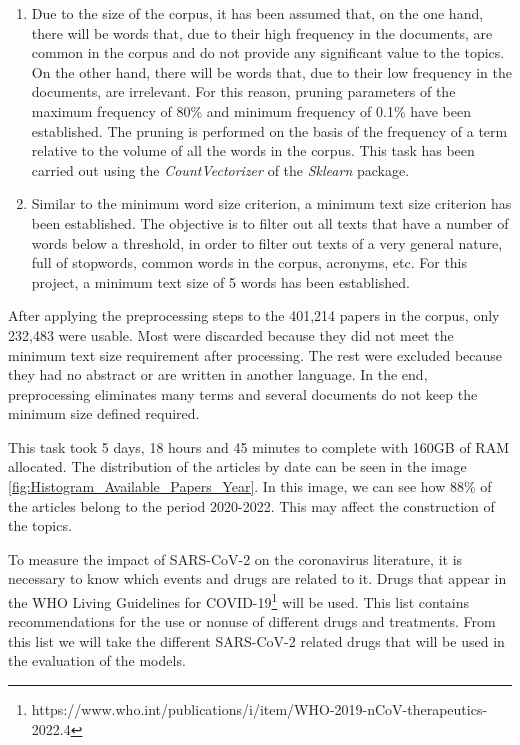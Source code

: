 \documentclass[a4paper,10pt]{article}
\begin{document}
\begin{enumerate}
    \item Due to the size of the corpus, it has been assumed that, on the one hand, there will be words that, due to their high frequency in the documents, are common in the corpus and do not provide any significant value to the topics. On the other hand, there will be words that, due to their low frequency in the documents, are irrelevant. For this reason, pruning parameters of the maximum frequency of 80\% and minimum frequency of 0.1\% have been established. The pruning is performed on the basis of the frequency of a term relative to the volume of all the words in the corpus. This task has been carried out using the \textit{CountVectorizer} of the \textit{Sklearn} package.

    \item Similar to the minimum word size criterion, a minimum text size criterion has been established. The objective is to filter out all texts that have a number of words below a threshold, in order to filter out texts of a very general nature, full of stopwords, common words in the corpus, acronyms, etc. For this project, a minimum text size of 5 words has been established.
\end{enumerate}


After applying the preprocessing steps to the 401,214 papers in the corpus, only 232,483 were usable. Most were discarded because they did not meet the minimum text size requirement after processing. The rest were excluded because they had no abstract or are written in another language. In the end, preprocessing eliminates many terms and several documents do not keep the minimum size defined required.

This task took 5 days, 18 hours and 45 minutes to complete with 160GB of RAM allocated. The distribution of the articles by date can be seen in the image \ref{fig:Histogram_Available_Papers_Year}. In this image, we can see how 88\% of the articles belong to the period 2020-2022. This may affect the construction of the topics.

To measure the impact of SARS-CoV-2 on the coronavirus literature, it is necessary to know which events and drugs are related to it. Drugs that appear in the WHO Living Guidelines for COVID-19\footnote{https://www.who.int/publications/i/item/WHO-2019-nCoV-therapeutics-2022.4} will be used. This list contains recommendations for the use or nonuse of different drugs and treatments. From this list we will take the different SARS-CoV-2 related drugs that will be used in the evaluation of the models.
\end{document}
